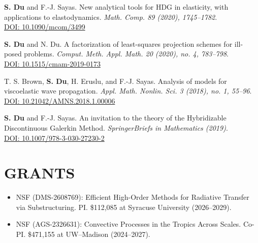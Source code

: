 \documentclass[11pt]{res}
\newenvironment{cvitemize}{\begin{itemize}\itemsep -2pt}{\end{itemize}\vspace{-5pt}}
\newenvironment{cvenumerate}{\begin{etaremune}\itemsep -2pt}{\end{etaremune}\vspace{-5pt}}
\begin{document}
\begin{resume}
\begin{cvenumerate}
\item {\bf S. Du} and F.-J. Sayas. New analytical tools for HDG in elasticity, with applications to elastodynamics. {\sl Math. Comp. 89 (2020), 1745--1782}.\\
\href{https://doi.org/10.1090/mcom/3499}{DOI: 10.1090/mcom/3499}

\item
{\bf S. Du} and N. Du. A factorization of least-squares projection schemes for ill-posed problems. {\sl Comput. Meth. Appl. Math. 20 (2020), no. 4, 783--798}.\\
\href{https://doi.org/10.1515/cmam-2019-0173}{DOI: 10.1515/cmam-2019-0173}

\item T. S. Brown, {\bf S. Du}, H. Eruslu, and F.-J. Sayas. Analysis of models for viscoelastic wave propagation. {\sl Appl. Math. Nonlin. Sci. 3 (2018), no. 1, 55--96}.\\
\href{https://doi.org/10.21042/AMNS.2018.1.00006}{DOI: 10.21042/AMNS.2018.1.00006}


\item[]
\item[]
\hspace{-1cm}{\bf Books}

\item
{\bf S. Du} and F.-J. Sayas. An invitation to the theory of the Hybridizable Discontinuous Galerkin Method. {\sl SpringerBriefs in Mathematics (2019)}.\\
\href{https://doi.org/10.1007/978-3-030-27230-2}{DOI: 10.1007/978-3-030-27230-2}
\end{cvenumerate}



\section{GRANTS}
\begin{cvitemize}
\item NSF (DMS-2608769): Efficient High-Order Methods for Radiative Transfer via Substructuring. PI. \$112,085 at Syracuse University (2026--2029).
\item NSF (AGS-2326631): Convective Processes in the Tropics Across Scales. Co-PI. \$471,155 at UW--Madison (2024--2027).
\end{cvitemize}



\end{resume}
\end{document}
